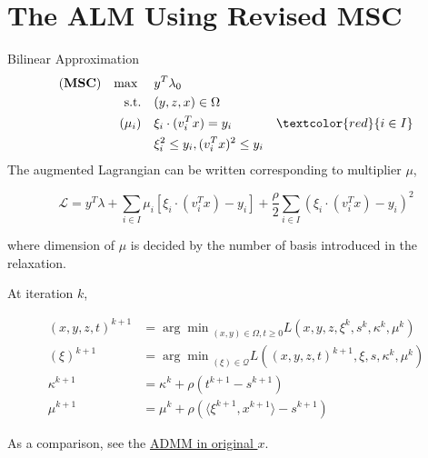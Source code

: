 \documentclass[aspectratio=1610, 9pt]{beamer}
\newcommand{\model}[1]{(\textbf{#1})}
\newcommand{\mx}{\mathbf{\max}\;}
\newcommand{\red}[1]{\textcolor{red}{#1}}
\begin{document}
\section{The ALM Using Revised MSC}
\begin{frame}{Bilinear Approximation}
  \begin{align}
    \model{MSC} \quad \mx \quad & y ^T\lambda_0                                       \\
    \mathrm{s.t.} \quad         & (y,z,x) \in \Omega                                  \\
    ( \mu_i)    \quad           & \xi_i \cdot (v_i^Tx) = y_i           & \red{i\in I} \\
                                & \xi_i^2 \le y_i,  (v_i^Tx)^2 \le y_i
  \end{align}
  The augmented Lagrangian can be written corresponding to multiplier \(\mu\),

  \begin{equation}
    \mathcal L = y^T\lambda + \sum_{i \in I} \mu_i \left [\xi_i \cdot(v_i^Tx) - y_i\right] + \frac{\rho}{2}\sum_{i \in I} (\xi_i \cdot (v_i^Tx) - y_i)^2
  \end{equation}

  where dimension of \(\mu\) is decided by the number of basis introduced in the relaxation.

  At iteration \(k\),

  \begin{align*}
    (x,y,z,t)^{k+1} & = {\arg\min}_{(x,y)\in\Omega, t\ge 0} L\left(x,y,z,\xi^k,s^k,\kappa^k,\mu^k\right)      \\
    (\xi)^{k+1}     & = {\arg\min}_{(\xi)\in\mathscr{Q}} L\left((x,y,z,t)^{k+1},\xi,s, \kappa^k, \mu^k\right) \\
    \kappa^{k+1}    & = \kappa^k + \rho\left(t^{k+1}-s^{k+1}\right)                                           \\
    \mu^{k+1}       & = \mu^k + \rho\left( \langle\xi^{k+1}, x^{k+1}\rangle - s^{k+1}\right)
  \end{align*}

  As a comparison, see the \hyperlink{oldad}{ADMM in original \(x\)}.
\end{frame}
\end{document}
